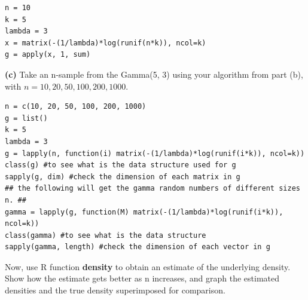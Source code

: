 \documentclass[letter,10.5pt]{article}
\numberwithin{equation}{subsection}
\begin{document}
\begin{boxedminipage}{\textwidth}
\scriptsize
\begin{verbatim}
n = 10
k = 5
lambda = 3
x = matrix(-(1/lambda)*log(runif(n*k)), ncol=k)
g = apply(x, 1, sum)
\end{verbatim}
\end{boxedminipage}

\noindent
\textbf{(c)} Take an n-sample from the Gamma(5, 3) using your algorithm from part (b), with $n = 10, 20, 50, 100, 200, 1000.$

\begin{boxedminipage}{\textwidth}
\scriptsize
\begin{verbatim}
n = c(10, 20, 50, 100, 200, 1000)
g = list()
k = 5
lambda = 3
g = lapply(n, function(i) matrix(-(1/lambda)*log(runif(i*k)), ncol=k))
class(g) #to see what is the data structure used for g
sapply(g, dim) #check the dimension of each matrix in g
## the following will get the gamma random numbers of different sizes n. ##
gamma = lapply(g, function(M) matrix(-(1/lambda)*log(runif(i*k)), ncol=k)) 
class(gamma) #to see what is the data structure
sapply(gamma, length) #check the dimension of each vector in g
\end{verbatim}
\end{boxedminipage}

\noindent
{} Now, use R function \textbf{density} to obtain an estimate of the underlying density. Show how the estimate gets better as n increases, and graph the estimated densities and the true density superimposed for comparison. 
\end{document}
